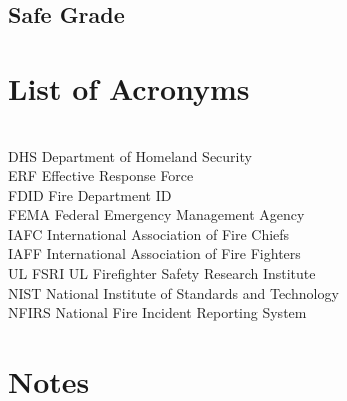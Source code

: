 \documentclass[12pt,oneside]{book}
\begin{document}
\section{Safe Grade}










\chapter{List of Acronyms}

\begin{tabbing}
\hspace{1.5in} \= \\

DHS \> Department of Homeland Security \\
ERF \> Effective Response Force \\
FDID \> Fire Department ID \\
FEMA \> Federal Emergency Management Agency \\
IAFC \> International Association of Fire Chiefs \\
IAFF \> International Association of Fire Fighters \\
UL FSRI \> UL Firefighter Safety Research Institute \\
NIST \> National Institute of Standards and Technology  \\
NFIRS \> National Fire Incident Reporting System \\
\end{tabbing}



\chapter*{Notes}
\end{document}
